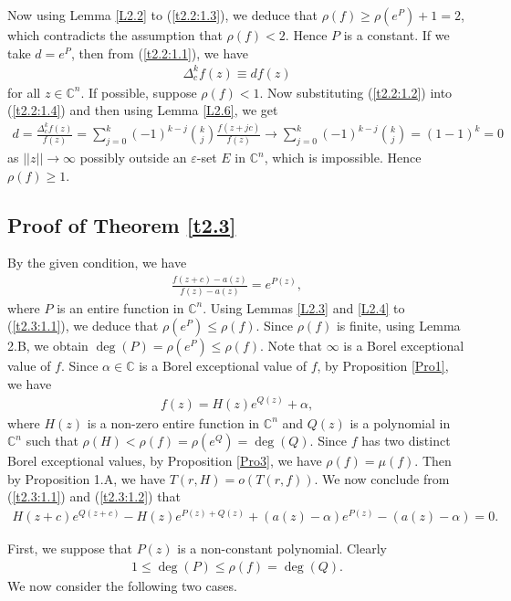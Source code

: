 \documentclass[11pt,reqno]{amsart}
\numberwithin{equation}{section}
\begin{document}
Now using Lemma \ref{L2.2} to (\ref{t2.2:1.3}), we deduce that $\rho(f)\ge \rho(e^P)+ 1=2$, which contradicts the assumption that $\rho(f)<2$. Hence $P$ is a constant. If we take $d=e^P$, then from (\ref{t2.2:1.1}), we have 
\begin{align}\label{t2.2:1.4}
\Delta_c^{k} f(z) \equiv df(z)
\end{align}
for all $z\in\mathbb{C}^n$. If possible, suppose $\rho(f)<1$. Now substituting (\ref{t2.2:1.2}) into (\ref{t2.2:1.4}) and then using Lemma \ref{L2.6}, we get
\begin{align*}
d=\frac{\Delta_c^{k} f(z)}{f(z)}=\sum_{j=0}^{k}(-1)^{k-j}\binom{k}{j}\frac{f(z + jc)}{f(z)}\to \sum_{j=0}^{k}(-1)^{k-j}\binom{k}{j}=(1-1)^k=0
\end{align*}
as $||z||\to\infty$ possibly outside an $\varepsilon$-set $E$ in $\mathbb{C}^n$, which is impossible. Hence $\rho(f)\geq 1$.

\subsection{{Proof of Theorem \ref{t2.3}}} By the given condition, we have
\begin{align}\label{t2.3:1.1}
\frac{f(z+c)-a(z)}{f(z)-a(z)}=e^{P(z)},
\end{align}
where $P$ is an entire function in $\mathbb{C}^n$. Using Lemmas \ref{L2.3} and \ref{L2.4} to (\ref{t2.3:1.1}), we deduce that $\rho(e^P)\leq \rho(f)$. Since $\rho(f)$ is finite, using Lemma 2.B, we obtain $\deg(P)=\rho(e^P)\leq \rho(f)$. Note that $\infty$ is a Borel exceptional value of $f$. Since $\alpha\in\mathbb{C}$ is a Borel exceptional value of $f$, by Proposition \ref{Pro1}, we have 
\begin{align}\label{t2.3:1.2}
f(z)=H(z)e^{Q(z)}+\alpha,
\end{align}
where $H(z)$ is a non-zero entire function in $\mathbb{C}^n$ and $Q(z)$ is a polynomial in $\mathbb{C}^n$ such that $\rho(H)<\rho(f)=\rho(e^Q)=\deg(Q)$. Since $f$ has two distinct Borel exceptional values, by Proposition \ref{Pro3}, we have $\rho(f)=\mu(f)$. Then by Proposition 1.A, we have $T(r,H)=o(T(r,f))$. We now conclude from (\ref{t2.3:1.1}) and (\ref{t2.3:1.2}) that
\begin{align}\label{T2.3:1.3}
H(z+c)e^{Q(z+c)}-H(z)e^{P(z)+Q(z)}+(a(z)-\alpha)e^{P(z)}-(a(z)-\alpha)= 0.
\end{align}

First, we suppose that $P(z)$ is a non-constant polynomial. Clearly
\begin{align*}
1 \le \deg(P) \le \rho(f) = \deg(Q).
\end{align*}
We now consider the following two cases.
\end{document}
